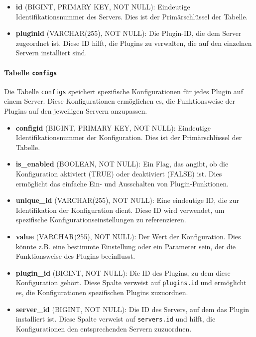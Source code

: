 \begin{itemize}
\item
  \textbf{id} (BIGINT, PRIMARY KEY, NOT NULL): Eindeutige Identifikationsnummer des Servers. Dies ist der Primärschlüssel der Tabelle.
\item
  \textbf{pluginid} (VARCHAR(255), NOT NULL): Die Plugin-ID, die dem Server zugeordnet ist. Diese ID hilft, die Plugins zu verwalten, die auf den einzelnen Servern installiert sind.
\end{itemize}

\paragraph{\texorpdfstring{Tabelle \texttt{configs}}{Tabelle configs}}\label{tabelle-configs}

Die Tabelle \texttt{configs} speichert spezifische Konfigurationen für jedes Plugin auf einem Server. Diese Konfigurationen ermöglichen es, die Funktionsweise der Plugins auf den jeweiligen Servern anzupassen.

\begin{itemize}
\item
  \textbf{configid} (BIGINT, PRIMARY KEY, NOT NULL): Eindeutige Identifikationsnummer der Konfiguration. Dies ist der Primärschlüssel der Tabelle.
\item
  \textbf{is\_enabled} (BOOLEAN, NOT NULL): Ein Flag, das angibt, ob die Konfiguration aktiviert (TRUE) oder deaktiviert (FALSE) ist. Dies ermöglicht das einfache Ein- und Ausschalten von Plugin-Funktionen.
\item
  \textbf{unique\_id} (VARCHAR(255), NOT NULL): Eine eindeutige ID, die zur Identifikation der Konfiguration dient. Diese ID wird verwendet, um spezifische Konfigurationseinstellungen zu referenzieren.
\item
  \textbf{value} (VARCHAR(255), NOT NULL): Der Wert der Konfiguration. Dies könnte z.B. eine bestimmte Einstellung oder ein Parameter sein, der die Funktionsweise des Plugins beeinflusst.
\item
  \textbf{plugin\_id} (BIGINT, NOT NULL): Die ID des Plugins, zu dem diese Konfiguration gehört. Diese Spalte verweist auf \texttt{plugins.id} und ermöglicht es, die Konfigurationen spezifischen Plugins zuzuordnen.
\item
  \textbf{server\_id} (BIGINT, NOT NULL): Die ID des Servers, auf dem das Plugin installiert ist. Diese Spalte verweist auf \texttt{servers.id} und hilft, die Konfigurationen den entsprechenden Servern zuzuordnen.
\end{itemize}

